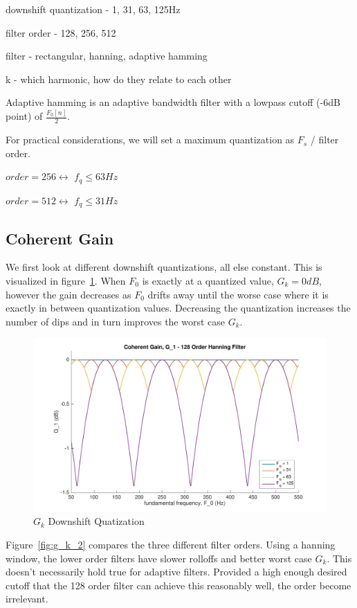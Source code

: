 \documentclass [11pt, proquest,oneside] {uwthesis}[2015/03/03]
\begin{document}
downshift quantization - 1, 31, 63, 125Hz

filter order - 128, 256, 512

filter - rectangular, hanning, adaptive hamming

k - which harmonic, how do they relate to each other

Adaptive hamming is an adaptive bandwidth filter with a lowpass cutoff (-6dB point) of $\frac{F_0[n]}{2}$.

For practical considerations, we will set a maximum quantization as $F_s$ /  filter order.

$order = 256 \longleftrightarrow$ $f_q \leq 63Hz$

$order = 512 \longleftrightarrow$ $f_q \leq 31Hz$

\subsection{Coherent Gain}

We first look at different downshift quantizations, all else constant.  This is visualized in figure~\ref{fig:g_k_1}.  When $F_0$ is exactly at a quantized value, $G_k = 0dB$, however the gain decreases as $F_0$ drifts away until the worse case where it is exactly in between quantization values.  Decreasing the quantization increases the number of dips and in turn improves the worst case $G_k$.

\begin{figure}[!ht]
  \centering
    \includegraphics[width=1\textwidth]{g_k_1}   
    \caption{$G_k$ Downshift Quatization}\label{fig:g_k_1}
\end{figure}

Figure~\ref{fig:g_k_2} compares the three different filter orders.  Using a hanning window, the lower order filters have slower rolloffs and better worst case $G_k$.  This doesn't necessarily hold true for adaptive filters.  Provided a high enough desired cutoff that the 128 order filter can achieve this reasonably well, the order become irrelevant.
\end{document}
